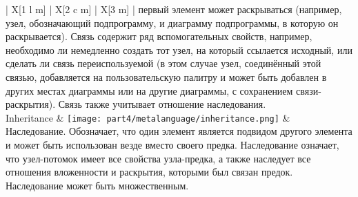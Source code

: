\begin{center}
\begin{longtabu} {| X[1 l m] | X[2 c m] | X[3 m] |}
		                                                                                                                первый элемент может раскрываться (например, узел, обозначающий подпрограмму, и диаграмму  
		                                                                                                                подпрограммы, в которую он раскрывается). Связь содержит ряд вспомогательных свойств, 
		                                                                                                                например, необходимо ли немедленно создать тот узел, на который ссылается исходный, или 
		                                                                                                                сделать ли связь переиспользуемой (в этом случае узел, соединённый этой связью, 
		                                                                                                                добавляется на пользовательскую палитру и может быть добавлен в других местах 
		                                                                                                                диаграммы или на другие диаграммы, с сохранением связи-раскрытия). Связь также  
		                                                                                                                учитывает отношение наследования. \\
		Inheritance                 & \texttt{[image: part4/metalanguage/inheritance.png]}                 & Наследование. Обозначает, что один элемент является подвидом другого элемента и может 
		                                                                                                                быть использован везде вместо своего предка. Наследование означает, что узел-потомок имеет  
		                                                                                                                все свойства узла-предка, а также наследует все отношения вложенности и раскрытия, 
		                                                                                                                которыми был связан предок. Наследование может быть множественным.
		\label{tab:metalanguage}
	\end{longtabu}

\end{center}

